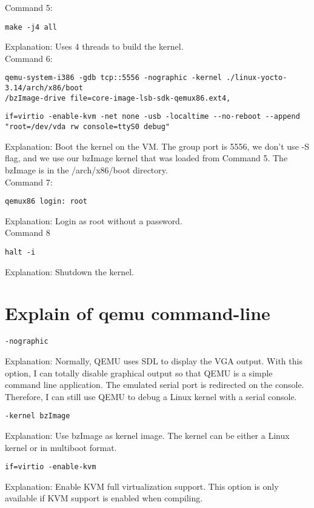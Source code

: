 \documentclass[10pt,draftclsnofoot,peerreview,letterpaper,onecolumn,]{IEEEtran}
\begin{document}
Command 5:
\begin{verbatim}
make -j4 all
\end{verbatim}
Explanation: Uses 4 threads to build the kernel.\\

Command 6:
\begin{verbatim}
qemu-system-i386 -gdb tcp::5556 -nographic -kernel ./linux-yocto-3.14/arch/x86/boot
/bzImage-drive file=core-image-lsb-sdk-qemux86.ext4,
\end{verbatim}
\begin{verbatim}
if=virtio -enable-kvm -net none -usb -localtime --no-reboot --append
"root=/dev/vda rw console=ttyS0 debug"
\end{verbatim}
Explanation: Boot the kernel on the VM. The group port is 5556, we don't use -S flag, and we use our bzImage kernel that was loaded from Command 5.
The bzImage is in the /arch/x86/boot directory.\\

Command 7:
\begin{verbatim}
qemux86 login: root
\end{verbatim}
Explanation: Login as root without a password.\\

Command 8
\begin{verbatim}
halt -i
\end{verbatim}
Explanation: Shutdown the kernel.\\


\newpage
\section{Explain of qemu command-line}
\begin{verbatim}
-nographic
\end{verbatim}
Explanation: Normally, QEMU uses SDL to display the VGA output. With this option, I can totally disable graphical output so that QEMU is a simple command line application. The emulated serial port is redirected on the console. Therefore, I can still use QEMU to debug a Linux kernel with a serial console.

\begin{verbatim}
-kernel bzImage
\end{verbatim}
Explanation: Use bzImage as kernel image. The kernel can be either a Linux kernel or in multiboot format.

\begin{verbatim}
if=virtio -enable-kvm
\end{verbatim}
Explanation: Enable KVM full virtualization support. This option is only available if KVM support is enabled when compiling.
\end{document}
